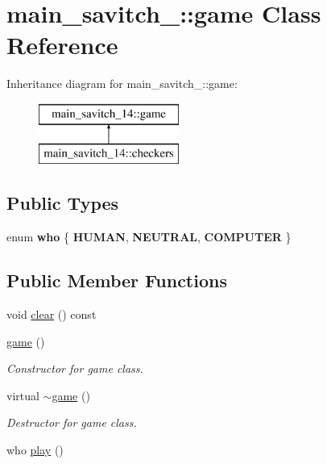 \hypertarget{classmain__savitch__14_1_1game}{}\section{main\+\_\+savitch\+\_\+:\+:game Class Reference}
\label{classmain__savitch__14_1_1game}
Inheritance diagram for main\+\_\+savitch\+\_\+:\+:game\+:\begin{figure}[H]
\begin{center}
\leavevmode
\includegraphics[height=2.000000cm]{classmain__savitch__14_1_1game}
\end{center}
\end{figure}
\subsection*{Public Types}
\begin{DoxyCompactItemize}
\item 
\mbox{\label{classmain__savitch__14_1_1game_a4fe20fb287f809ae2b68e28e4ccba634}} 
enum {\bfseries who} \{ {\bfseries H\+U\+M\+AN}, 
{\bfseries N\+E\+U\+T\+R\+AL}, 
{\bfseries C\+O\+M\+P\+U\+T\+ER}
 \}
\end{DoxyCompactItemize}
\subsection*{Public Member Functions}
\begin{DoxyCompactItemize}
\item 
void \hyperlink{classmain__savitch__14_1_1game_a51e5d7be01076996b68449983874ff8f}{clear} () const
\item 
\hyperlink{classmain__savitch__14_1_1game_a65afffa6f5aa8dcd781ad38f898130e0}{game} ()
\begin{DoxyCompactList}\small\item\em Constructor for game class. \end{DoxyCompactList}\item 
\mbox{\label{classmain__savitch__14_1_1game_a5e8d21d1d658a12db6fddacca3490671}} 
virtual \hyperlink{classmain__savitch__14_1_1game_a5e8d21d1d658a12db6fddacca3490671}{$\sim$game} ()
\begin{DoxyCompactList}\small\item\em Destructor for game class. \end{DoxyCompactList}\item 
who \hyperlink{classmain__savitch__14_1_1game_a4dbeaddb78059f7c5dcbf5cc4e026317}{play} ()
\end{DoxyCompactItemize}
